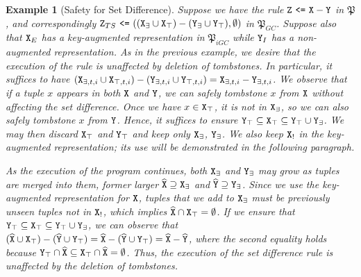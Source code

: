 \documentclass{article}
\numberwithin{equation}{section}
\newtheorem{example}{Example}[section]
\renewcommand{\tt}[1]{\ifmmode\text{\texttt{#1}}\else\texttt{#1}\fi}
\begin{document}
\begin{example}[Safety for Set Difference]
Suppose we have the rule $\tt{Z} ~\tt{<=}~ \tt{X} - \tt{Y}$ in $\mathfrak{P}$, and correspondingly $\tt{Z}_{TS} ~\tt{<=}~ ((\tt{X}_\exists \cup \tt{X}_\top) - (\tt{Y}_\exists \cup \tt{Y}_\top), \emptyset)$ in $\mathfrak{P}_{GC}$.
Suppose also that $\tt{X}_E$ has a key-augmented representation in $\mathfrak{P}_{iGC}$ while $\tt{Y}_I$ has a non-augmented representation.
As in the previous example, we desire that the execution of the rule is unaffected by deletion of tombstones.
In particular, it suffices to have
$(\tt{X}_{\exists,t,i} \cup \tt{X}_{\top,t,i}) - (\tt{Y}_{\exists,t,i} \cup \tt{Y}_{\top,t,i}) = \tt{X}_{\exists,t,i} - \tt{Y}_{\exists,t,i}$.
We observe that if a tuple $x$ appears in both $\tt{X}$ and $\tt{Y}$, we can safely tombstone $x$ from $\tt{X}$ without affecting the set difference.
Once we have $x \in \tt{X}_\top$, it is not in $\tt{X}_\exists$, so we can also safely tombstone $x$ from $\tt{Y}$.
Hence, it suffices to ensure $\tt{Y}_\top \subseteq \tt{X}_\top \subseteq \tt{Y}_\top \cup \tt{Y}_\exists$.
We may then discard $\tt{X}_\top$ and $\tt{Y}_\top$ and keep only $\tt{X}_\exists$, $\tt{Y}_\exists$.
We also keep $\tt{X}_!$ in the key-augmented representation; its use will be demonstrated in the following paragraph.

As the execution of the program continues, both $\tt{X}_\exists$ and $\tt{Y}_\exists$ may grow as tuples are merged into them, former larger $\widehat{\tt{X}} \supseteq \tt{X}_\exists$ and $\widehat{\tt{Y}} \supseteq \tt{Y}_\exists$.
Since we use the key-augmented representation for $\tt{X}$, tuples that we add to $\tt{X}_\exists$ must be previously unseen tuples not in $\tt{X}_!$, which implies $\widehat{\tt{X}} \cap \tt{X}_\top = \emptyset$.
If we ensure that $\tt{Y}_\top \subseteq \tt{X}_\top \subseteq \tt{Y}_\top \cup \tt{Y}_\exists$, we can observe that
$
(\widehat{\tt{X}} \cup \tt{X}_\top) - (\widehat{\tt{Y}} \cup \tt{Y}_\top)
= \widehat{\tt{X}} - (\widehat{\tt{Y}} \cup \tt{Y}_\top)
= \widehat{\tt{X}} - \widehat{\tt{Y}}
$,
where the second equality holds because $\tt{Y}_\top \cap \widehat{\tt{X}} \subseteq \tt{X}_\top \cap \widehat{\tt{X}} = \emptyset$.
Thus, the execution of the set difference rule is unaffected by the deletion of tombstones.
\end{example}
\end{document}

